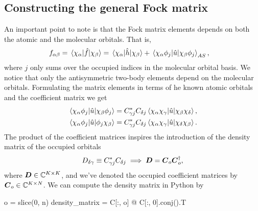         \subsection{Constructing the general Fock matrix}
            An important point to note is that the Fock matrix elements depends
            on both the atomic and the molecular orbitals.
            That is,
            \begin{align}
                f_{\alpha\beta}
                &= \mel*{\chi_{\alpha}}{\hat{f}}{\chi_{\beta}}
                = \mel*{\chi_{\alpha}}{\hat{h}}{\chi_{\beta}}
                +
                \mel*{\chi_{\alpha}\phi_j}{\hat{u}}{\chi_{\beta}\phi_j}_{AS},
            \end{align}
            where $j$ only sums over the occupied indices in the molecular
            orbital basis.
            We notice that only the antisymmetric two-body elements depend on
            the molecular orbitals.
            Formulating the matrix elements in terms of he known atomic orbitals
            and the coefficient matrix we get
            \begin{align}
                \mel*{\chi_{\alpha}\phi_j}{\hat{u}}{\chi_{\beta}\phi_j}
                &=
                C^{*}_{\gamma j} C_{\delta j}
                \mel*{\chi_{\alpha}\chi_{\gamma}}{\hat{u}}{\chi_{\beta}\chi_{\delta}},
                \\
                \mel*{\chi_{\alpha}\phi_j}{\hat{u}}{\phi_j\chi_{\beta}}
                &=
                C^{*}_{\gamma j} C_{\delta j}
                \mel*{\chi_{\alpha}\chi_{\gamma}}{\hat{u}}{\chi_{\delta}\chi_{\beta}}.
            \end{align}
            The product of the coefficient matrices inspires the introduction of
            the density matrix of the occupied orbitals
            \begin{align}
                D_{\delta\gamma} \equiv
                C^{*}_{\gamma j} C_{\delta j}
                \implies
                \boldsymbol{D} = \boldsymbol{C}_{o}\boldsymbol{C}^{\dagger}_{o},
                \label{eq:ghf-density-matrix}
            \end{align}
            where $\boldsymbol{D} \in \mathbb{C}^{K \times K}$, and we've denoted the
            occupied coefficient matrices by $\boldsymbol{C}_o \in \mathbb{C}^{K \times
            N}$.
            We can compute the density matrix in Python by
            \begin{python}
o = slice(0, n)
density_matrix = C[:, o] @ C[:, 0].conj().T
            \end{python}
